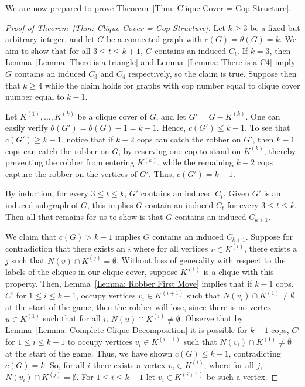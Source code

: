 \documentclass[12pt]{amsart}
\theoremstyle{definition}
\begin{document}
We are now prepared to prove Theorem~\ref{Thm: Clique Cover = Cop Structure}.

\begin{proof}[Proof of Theorem~\ref{Thm: Clique Cover = Cop Structure}]
Let $k\geq 3$ be a fixed but arbitrary integer, and let $G$ be a connected graph with $c(G) = \theta(G) = k$.
We aim to show that for all $3 \leq t\leq k+1$, $G$ contains an induced $C_t$.
If $k = 3$, then Lemma~\ref{Lemma: There is a triangle} and Lemma~\ref{Lemma: There is a C4} imply $G$ contains an induced $C_3$ and $C_4$ respectively, so the claim is true.
Suppose then that $k\geq 4$ while the claim holds for graphs with cop number equal to clique cover number equal to $k-1$.

Let $K^{(1)},\dots, K^{(k)}$ be a clique cover of $G$,
and let $G' = G - K^{(k)}$.
One can easily verify $\theta(G') = \theta(G) - 1 = k-1$.
Hence, $c(G') \leq k-1$.
To see that $c(G')\geq k-1$, notice that if $k-2$ cops can catch the robber on $G'$, then $k-1$ cops can catch the robber on $G$, 
by reserving one cop to stand on $K^{(k)}$, thereby preventing the robber from entering $K^{(k)}$, while the remaining $k-2$ cops capture the robber on the vertices of $G'$.
Thus, $c(G') = k-1$.

By induction, for every $3 \leq t \leq k$, $G'$ contains an induced $C_t$.
Given $G'$ is an induced subgraph of $G$, this implies $G$ contain an induced $C_t$ for every $3 \leq t \leq k$.
Then all that remains for us to show is that $G$ contains an induced $C_{k+1}$.

    We claim that $c(G) > k-1$ implies $G$ contains an induced $C_{k+1}$.
    Suppose for contradiction that there exists an $i$ where for all vertices $v \in K^{(i)}$, there exists a $j$ such that $N(v)\cap K^{(j)} = \emptyset$.
    Without loss of generality with respect to the labels of the cliques in our clique cover, suppose $K^{(1)}$ is a clique with this property.
    Then, Lemma~\ref{Lemma: Robber First Move} implies 
    that 
    if $k-1$ cops, $C^i$ for $1\leq i \leq k-1$, occupy vertices $v_i \in K^{(i+1)}$ such that $N(v_i) \cap K^{(1)} \neq \emptyset$ at the start of the game,
    then the robber will lose, since there is no vertex 
    $u \in K^{(1)}$ such that for all $i$, $N(u) \cap K^{(i)} \neq \emptyset$.
    Observe that by Lemma~\ref{Lemma: Complete-Clique-Decomposition} it is possible for $k-1$ cops, $C^i$ for $1\leq i \leq k-1$ to occupy vertices $v_i \in K^{(i+1)}$ such that $N(v_i) \cap K^{(1)} \neq \emptyset$ at the start of the game.
    Thus, we have shown $c(G) \leq k-1$, contradicting $c(G) = k$.
    So, for all $i$ there exists a vertex $v_i \in K^{(i)}$, where for all $j$, $N(v_i)\cap K^{(j)} = \emptyset$.
    For $1\leq i \leq k-1$ let $v_i \in K^{(i+1)}$ be such a vertex.


\end{proof}
\end{document}
